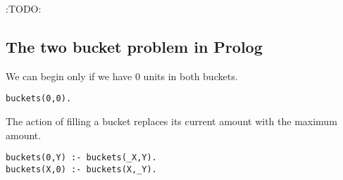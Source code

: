 \documentclass[11pt]{article}
\begin{document}
:TODO:

\subsection{The two bucket problem in Prolog}
\label{sec:orga8baaa7}
We can begin only if we have 0 units in both buckets.
\begin{verbatim}
buckets(0,0).
\end{verbatim}

The action of filling a bucket replaces its current amount
with the maximum amount.
\begin{verbatim}
buckets(0,Y) :- buckets(_X,Y).
buckets(X,0) :- buckets(X,_Y).
\end{verbatim}
\end{document}
